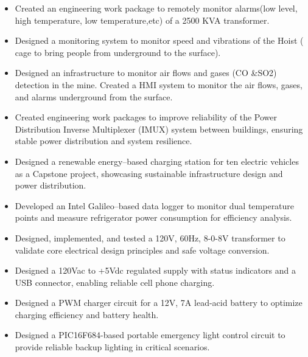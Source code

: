 \documentclass[10pt,a4paper,ragged2e,withhyper]{altacv}
\begin{document}
\begin{itemize}
\item Created an engineering work package to remotely monitor alarms(low level, high temperature, low temperature,etc) of a 2500 KVA transformer.
\item Designed a monitoring system to monitor speed and vibrations of the Hoist ( cage to bring people from underground to the surface).
\item Designed an infrastructure to monitor air flows and gases (CO \&SO2) detection in the mine. Created a HMI system to monitor the air flows, gases, and alarms underground from the surface.
\item Created engineering work packages to improve reliability of the Power Distribution Inverse Multiplexer (IMUX) system between buildings, ensuring stable power distribution and system resilience.
\item Designed a renewable energy–based charging station for ten electric vehicles as a Capstone project, showcasing sustainable infrastructure design and power distribution.  
\item Developed an Intel Galileo–based data logger to monitor dual temperature points and measure refrigerator power consumption for efficiency analysis.  
\item Designed, implemented, and tested a 120V, 60Hz, 8-0-8V transformer to validate core electrical design principles and safe voltage conversion.  
\item Designed a 120Vac to +5Vdc regulated supply with status indicators and a USB connector, enabling reliable cell phone charging.  
\item Designed a PWM charger circuit for a 12V, 7A lead-acid battery to optimize charging efficiency and battery health.  
\item Designed a PIC16F684-based portable emergency light control circuit to provide reliable backup lighting in critical scenarios.  



\end{itemize}
\divider
\end{document}

